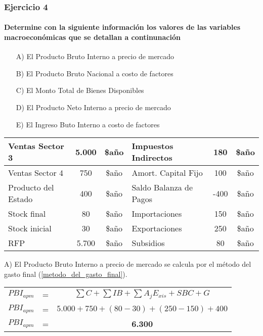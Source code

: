 \documentclass[12pt,a4paper]{article}
\newcommand{\consigna}[1]{\paragraph{\indent #1} \hspace{0pt}}
\begin{document}
    	\subsubsection{Ejercicio 4}
        
        \consigna{Determine con la siguiente información los valores de las variables macroeconómicas que se detallan a continunación}
        
        \begin{itemize}
			\item[A)]	El Producto Bruto Interno a precio de mercado
			\item[B)]	El Producto Bruto Nacional a costo de factores
            \item[C)]	El Monto Total de Bienes Disponibles
            \item[D)]	El Producto Neto Interno a precio de mercado
            \item[E)]	El Ingreso Buto Interno a costo de factores
		\end{itemize}
        
        \begin{table}[H]
        \centering
        	\begin{tabular}{ | l | c | c | l | c | c | }
            \hline
            Ventas Sector 3		& 5.000	& \$año	& Impuestos Indirectos	& 180 & \$año \\ \hline
            Ventas Sector 4		& 750	& \$año	& Amort. Capital Fijo	& 100 & \$año \\ \hline
            Producto del Estado	& 400	& \$año	& Saldo Balanza de Pagos &-400 & \$año \\ \hline
            Stock final			& 80	& \$año	& Importaciones			& 150 & \$año \\ \hline
            Stock inicial		& 30	& \$año	& Exportaciones			& 250 & \$año \\ \hline
            RFP					& 5.700	& \$año	& Subsidios				& 80 & \$año \\ \hline
			\end{tabular}
		\end{table}
        
        A) El Producto Bruto Interno a precio de mercado se calcula por el método del gasto final (\ref{metodo_del_gasto_final}).
        
		\begin{table}[H]
		\centering
        	\begin{tabular}{ c c c }
               	$ PBI_{apm} $ &=& $ \sum C + \sum IB + \sum {A}_{j} {E}_{xis} + SBC + G $ \\
                $ PBI_{apm} $ &=& $ 5{.}000 + 750 + ( 80 - 30 ) + ( 250 - 150 ) + 400 $ \\
                $ PBI_{apm} $ &=& \textbf{6.300}
			\end{tabular}
		\end{table}
        
\end{document}
